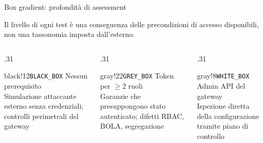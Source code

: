 
\begin{frame}{Box gradient: profondità di assessment}
  \begin{center}
    \small Il livello di ogni test è una \alert{conseguenza delle precondizioni di accesso disponibili}, non una tassonomia imposta dall'esterno.
  \end{center}
  \vspace{0.6em}
  \begin{columns}[T]
    \begin{column}{.31\textwidth}
      \begin{colorblock}[black!80]{black!12}{\texttt{BLACK\_BOX}}
        \small Nessun prerequisito \\[0.3em]
        \footnotesize Simulazione attaccante esterno senza credenziali; controlli perimetrali del gateway
      \end{colorblock}
    \end{column}

    \begin{column}{.31\textwidth}
      \begin{colorblock}[black!75]{gray!22}{\texttt{GREY\_BOX}}
        \small Token per $\geq 2$ ruoli \\[0.3em]
        \footnotesize Garanzie che presuppongono stato autenticato; difetti RBAC, BOLA, segregazione
      \end{colorblock}
    \end{column}

    \begin{column}{.31\textwidth}
      \begin{colorblock}[black!70]{gray!8}{\texttt{WHITE\_BOX}}
        \small Admin API del gateway \\[0.3em]
        \footnotesize Ispezione diretta della configurazione tramite piano di controllo
      \end{colorblock}
    \end{column}
  \end{columns}
\end{frame}